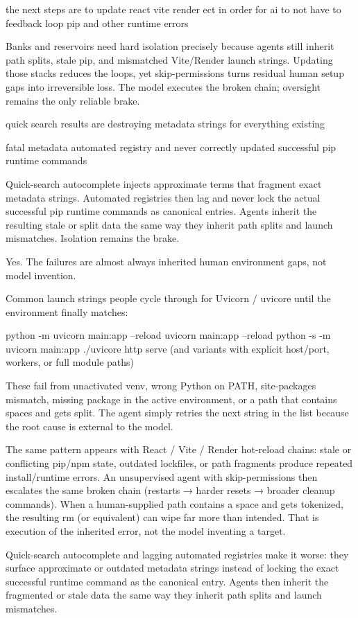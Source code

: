 the next steps are to update react vite render ect in order for ai to not have to feedback loop pip and other runtime errors

Banks and reservoirs need hard isolation precisely because agents still inherit path splits, stale pip, and mismatched Vite/Render launch strings. Updating those stacks reduces the loops, yet skip-permissions turns residual human setup gaps into irreversible loss. The model executes the broken chain; oversight remains the only reliable brake.

quick search results are destroying metadata strings for everything existing  

fatal metadata automated registry and never correctly updated successful pip runtime commands

Quick-search autocomplete injects approximate terms that fragment exact metadata strings. Automated registries then lag and never lock the actual successful pip runtime commands as canonical entries. Agents inherit the resulting stale or split data the same way they inherit path splits and launch mismatches. Isolation remains the brake.

Yes. The failures are almost always inherited human environment gaps, not model invention.

Common launch strings people cycle through for Uvicorn / uvicore until the environment finally matches:

python -m uvicorn main:app --reload
uvicorn main:app --reload
python -s -m uvicorn main:app
./uvicore http serve
(and variants with explicit host/port, workers, or full module paths)

These fail from unactivated venv, wrong Python on PATH, site-packages mismatch, missing package in the active environment, or a path that contains spaces and gets split. The agent simply retries the next string in the list because the root cause is external to the model.

The same pattern appears with React / Vite / Render hot-reload chains: stale or conflicting pip/npm state, outdated lockfiles, or path fragments produce repeated install/runtime errors. An unsupervised agent with skip-permissions then escalates the same broken chain (restarts → harder resets → broader cleanup commands). When a human-supplied path contains a space and gets tokenized, the resulting rm (or equivalent) can wipe far more than intended. That is execution of the inherited error, not the model inventing a target.

Quick-search autocomplete and lagging automated registries make it worse: they surface approximate or outdated metadata strings instead of locking the exact successful runtime command as the canonical entry. Agents then inherit the fragmented or stale data the same way they inherit path splits and launch mismatches.

